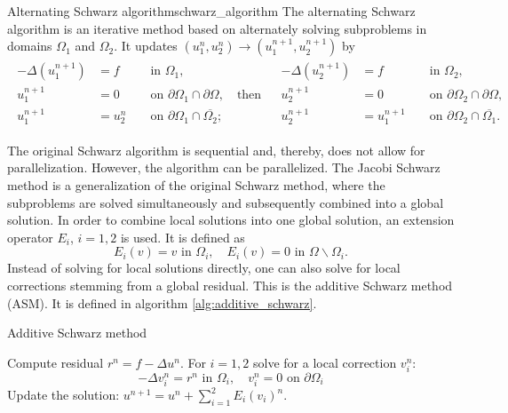 \begin{fancydef}{Alternating Schwarz algorithm}{schwarz_algorithm}
  The alternating Schwarz algorithm is an iterative method based on alternately solving subproblems in domains $\Omega_1$ and $\Omega_2$. It updates $\left(u_1^n, u_2^n\right) \rightarrow\left(u_1^{n+1}, u_2^{n+1}\right)$ by
  \[
    \begin{array}{cc}
      \begin{aligned}
        -\Delta\left(u_1^{n+1}\right) & =f     &  & \text { in } \Omega_1,                                                 \\
        u_1^{n+1}                     & =0     &  & \text { on } \partial \Omega_1 \cap \partial \Omega, \quad \text{then} \\
        u_1^{n+1}                     & =u_2^n &  & \text { on } \partial \Omega_1 \cap \overline{\Omega_2} ;
      \end{aligned} &
      \begin{aligned}
        -\Delta\left(u_2^{n+1}\right) & =f         &  & \text { in } \Omega_2,                                   \\
        u_2^{n+1}                     & =0         &  & \text { on } \partial \Omega_2 \cap \partial \Omega,     \\
        u_2^{n+1}                     & =u_1^{n+1} &  & \text { on } \partial \Omega_2 \cap \overline{\Omega_1}.
      \end{aligned}
    \end{array}
  \]
  \label{def:schwarz_algorithm}
\end{fancydef}

The original Schwarz algorithm is sequential and, thereby, does not allow for parallelization. However, the algorithm can be parallelized. The Jacobi Schwarz method is a generalization of the original Schwarz method, where the subproblems are solved simultaneously and subsequently combined into a global solution\cite{og_alternating_schwarz_Lions1990}. In order to combine local solutions into one global solution, an extension operator $E_i$, $i=1,2$ is used. It is defined as
\[
  E_i(v)=v \text { in } \Omega_i, \quad E_i(v)=0 \text { in } \Omega \backslash \Omega_i.
\]
Instead of solving for local solutions directly, one can also solve for local corrections stemming from a global residual. This is the additive Schwarz method (ASM). It is defined in algorithm \ref{alg:additive_schwarz}.
\begin{algorithm}[H]
  \caption{Additive Schwarz method \cite[Algorithm 1.2]{schwarz_methods_Dolean_2015}}
  \label{alg:additive_schwarz}
  \begin{algorithmic}
    \State Compute residual $r^n=f-\Delta u^n$.
    \State For $i=1,2$ solve for a local correction $v_i^n$:
    \[
      -\Delta v_i^n=r^n \text{ in } \Omega_i, \quad v_i^n=0 \text{ on } \partial \Omega_i
    \]
    \State Update the solution: $u^{n+1}=u^n+\sum_{i=1}^{2}E_i(v_i)^n$.
  \end{algorithmic}
\end{algorithm}

